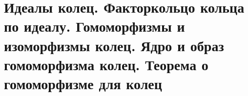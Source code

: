 \section{Идеалы колец. Факторкольцо кольца по идеалу. Гомоморфизмы и изоморфизмы колец. Ядро и образ гомоморфизма колец. Теорема о гомоморфизме для колец}